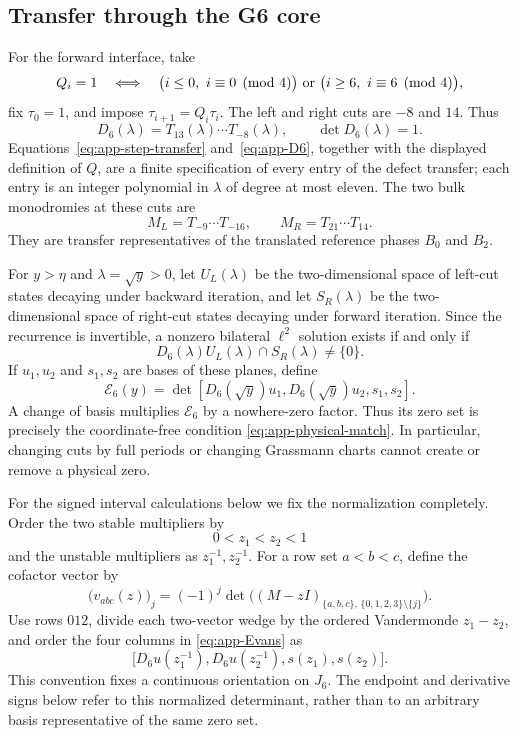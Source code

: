 \subsection{Transfer through the G6 core}
\label{appsubsec:g6-transfer}

For the forward interface, take
\[
 Q_i=1
 \quad\Longleftrightarrow\quad
 \bigl(i\leq0,\ i\equiv0\pmod4\bigr)
 \ \hbox{or}\
 \bigl(i\geq6,\ i\equiv6\pmod4\bigr),
\]
fix \(\tau_0=1\), and impose \(\tau_{i+1}=Q_i\tau_i\).  The left and
right cuts are \(-8\) and \(14\).  Thus
\begin{equation}
 D_6(\lambda)=T_{13}(\lambda)\cdots T_{-8}(\lambda),
 \qquad \det D_6(\lambda)=1.            \label{eq:app-D6}
\end{equation}
Equations~\eqref{eq:app-step-transfer} and~\eqref{eq:app-D6}, together with
the displayed definition of \(Q\), are a finite specification of
every entry of the defect transfer; each entry is an integer polynomial in
\(\lambda\) of degree at most eleven.  The two bulk monodromies at these
cuts are
\[
 M_L=T_{-9}\cdots T_{-16},\qquad
 M_R=T_{21}\cdots T_{14}.
\]
They are transfer representatives of the translated reference phases
\(B_0\) and \(B_2\).

For \(y>\eta\) and \(\lambda=\sqrt y>0\), let \(U_L(\lambda)\) be the
two-dimensional space of left-cut states decaying under backward iteration,
and let \(S_R(\lambda)\) be the two-dimensional space of right-cut states
decaying under forward iteration.  Since the recurrence is invertible, a
nonzero bilateral \(\ell^2\) solution exists if and only if
\begin{equation}
 D_6(\lambda)U_L(\lambda)\cap S_R(\lambda)\neq\{0\}.
                                                        \label{eq:app-physical-match}
\end{equation}
If \(u_1,u_2\) and \(s_1,s_2\) are bases of these planes, define
\begin{equation}
 \mathcal E_6(y)=
 \det[D_6(\sqrt y)u_1,D_6(\sqrt y)u_2,s_1,s_2].       \label{eq:app-Evans}
\end{equation}
A change of basis multiplies \(\mathcal E_6\) by a nowhere-zero factor.
Thus its zero set is precisely the coordinate-free condition
\eqref{eq:app-physical-match}.  In particular, changing cuts by full
periods or changing Grassmann charts cannot create or remove a physical
zero.

For the signed interval calculations below we fix the normalization
completely.  Order the two stable multipliers by
\[
0<z_1<z_2<1
\]
and the unstable multipliers as \(z_1^{-1},z_2^{-1}\).  For a row set
\(a<b<c\), define the cofactor vector by
\[
\bigl(v_{abc}(z)\bigr)_j
=(-1)^j\det\bigl((M-zI)_{\{a,b,c\},\,\{0,1,2,3\}\setminus\{j\}}\bigr).
\]
Use rows \(012\), divide each two-vector wedge by the ordered Vandermonde
\(z_1-z_2\), and order the four columns in
\eqref{eq:app-Evans} as
\[
\bigl[D_6u(z_1^{-1}),D_6u(z_2^{-1}),s(z_1),s(z_2)\bigr].
\]
This convention fixes a continuous orientation on \(J_6\).  The endpoint
and derivative signs below refer to this normalized determinant, rather than
to an arbitrary basis representative of the same zero set.

